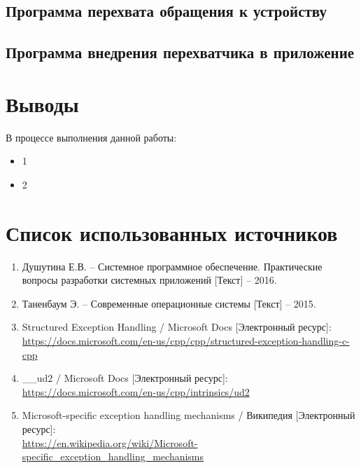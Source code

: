 

\subsection{Программа перехвата обращения к устройству}





\subsection{Программа внедрения перехватчика в приложение}



\newpage

\section{Выводы}

В процессе выполнения данной работы:

\begin{itemize}
	\item 1
	\item 2
\end{itemize}

\newpage

\section*{Список использованных источников}

\begin{enumerate}
	\item Душутина Е.В. -- Системное программное обеспечение. Практические вопросы разработки системных приложений [Текст] -- 2016.
	\item Таненбаум Э. -- Современные операционные системы [Текст] -- 2015.
	\item Structured Exception Handling / Microsoft Docs [Электронный ресурс]:\\
		{\small\url{https://docs.microsoft.com/en-us/cpp/cpp/structured-exception-handling-c-cpp}}
	\item \_\_ud2 / Microsoft Docs [Электронный ресурс]:\\
		{\small\url{https://docs.microsoft.com/en-us/cpp/intrinsics/ud2}}
	\item Microsoft-specific exception handling mechanisms / Википедия [Электронный ресурс]:\\
		{\small\url{https://en.wikipedia.org/wiki/Microsoft-specific_exception_handling_mechanisms}}
\end{enumerate}


